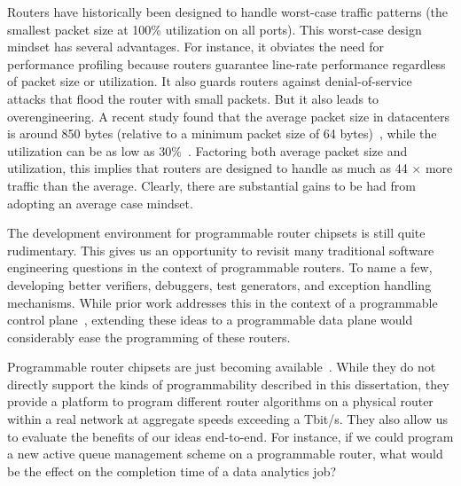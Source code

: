  Routers have historically been
designed to handle worst-case traffic patterns (\ie the smallest packet size at
100\% utilization on all ports). This worst-case design mindset has several
advantages. For instance, it obviates the need for performance profiling
because routers guarantee line-rate performance regardless of packet size or
utilization. It also guards routers against denial-of-service attacks that flood
the router with small packets. But it also leads to overengineering. A recent
study found that the average packet size in datacenters is around 850 bytes
(relative to a minimum packet size of 64 bytes)~\cite{theo_dc}, while the
utilization can be as low as 30\%~\cite{theo_dc}. Factoring both average packet
size and utilization, this implies that routers are designed to handle as much
as 44 $\times$ more traffic than the average. Clearly, there are substantial
gains to be had from adopting an average case mindset.

The development environment for programmable router chipsets is still quite
rudimentary. This gives us an opportunity to revisit many traditional software
engineering questions in the context of programmable routers. To name a few,
developing better verifiers, debuggers, test generators, and exception handling
mechanisms. While prior work addresses this in the context of a programmable
control plane~\cite{test_gen, hsa}, extending these ideas to a programmable
data plane would considerably ease the programming of these routers.

Programmable router chipsets are just becoming available~\cite{tofino}. While
they do not directly support the kinds of programmability described in this
dissertation, they provide a platform to program different router algorithms on
a physical router within a real network at aggregate speeds exceeding a Tbit/s.
They also allow us to evaluate the benefits of our ideas end-to-end. For
instance, if we could program a new active queue management scheme on a
programmable router, what would be the effect on the completion time of a
data analytics job?

